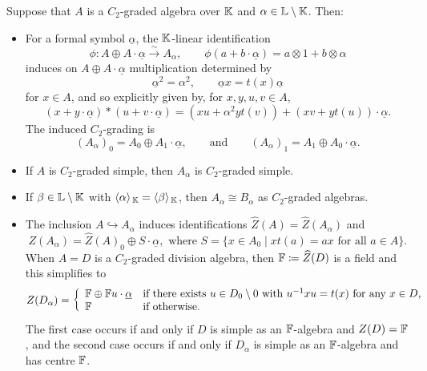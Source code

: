 \begin{lemma}\label{lem:Aalphaproperties}
    Suppose that $A$ is a $C_2$-graded algebra over ${\mathbb K}$ and $\alpha \in {\mathbb L} \setminus {\mathbb K}$. Then:
    \begin{itemize}
        \item For a formal symbol $\underline{\alpha}$, the ${\mathbb K}$-linear identification 
        \[
            \phi \colon A \oplus A \cdot \underline{\alpha} \xrightarrow{\sim} A_{\alpha}, \qquad \phi(a + b \cdot \underline{\alpha}) = a \otimes 1 + b \otimes \alpha
        \] 
        induces on $A \oplus A \cdot \underline{\alpha}$ multiplication determined by
\[
\underline{\alpha}^2 = \alpha^2, \qquad \underline{\alpha} x = t(x) \underline{\alpha}
\]
for $x \in A$, and so explicitly given by, for $x,y, u ,v \in A$,
        \[
        (x + y \cdot \underline{\alpha}) * (u + v \cdot \underline{\alpha}) = (xu + \alpha^2 y t(v)) + (xv + y t(u)) \cdot \underline{\alpha}.
        \]
        The induced $C_2$-grading is 
        \[
        (A_{\alpha})_0 = A_0 \oplus A_1 \cdot \underline{\alpha}, \qquad \text{and} \qquad (A_{\alpha})_1 = A_1 \oplus A_0 \cdot \underline{\alpha}.
        \]
        \item If $A$ is $C_2$-graded simple, then $A_{\alpha}$ is $C_2$-graded simple.
        \item If $\beta \in {\mathbb L} \setminus {\mathbb K}$ with $\langle \alpha \rangle_{\, {\mathbb K}} = \langle \beta \rangle_{\, {\mathbb K}}$, then $A_{\alpha} \cong B_{\alpha}$ as $C_2$-graded algebras.
        \item The inclusion $A \hookrightarrow A_{\alpha}$ induces identifications $\widehat{Z}(A) = \widehat{Z}(A_{\alpha})$ and
        \[
            Z(A_{\alpha}) = \widehat{Z}(A)_0 \oplus S \cdot \underline{\alpha}, \text{ where } S = \{x \in A_0 \mid x t(a) = ax \text{ for all } a \in A\}.
        \]
        When $A = D$ is a $C_2$-graded division algebra, then ${\mathbb F} \coloneqq\widehat{Z}(D)$ is a field and this simplifies to
        \[
        Z(D_{\alpha}) = \left\{ \begin{array}{ll} {\mathbb F} \oplus {\mathbb F} u \cdot \underline{\alpha} & \mbox{if } \text{there exists $u \in D_0 \setminus 0$ with $u^{-1}xu = t(x)$ for any $x \in D$,} \\ {\mathbb F} & \mbox{if } \text{otherwise.} \end{array} \right.
        \]
        The first case occurs if and only if $D$ is simple as an ${\mathbb F}$-algebra and $Z(D) = {\mathbb F}$, and the second case occurs if and only if $D_{\alpha}$ is simple as an ${\mathbb F}$-algebra and has centre ${\mathbb F}$.
    \end{itemize}
\end{lemma}

